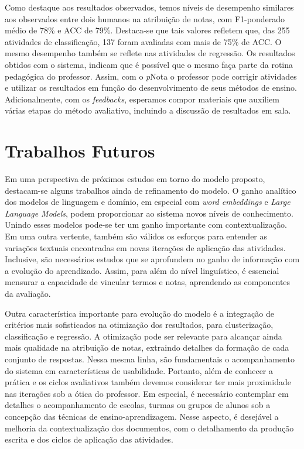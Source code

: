 Como destaque aos resultados observados, temos níveis de desempenho similares aos observados entre dois humanos na atribuição de notas, com F1-ponderado médio de 78\% e ACC de 79\%. Destaca-se que tais valores refletem que, das 255 atividades de classificação, 137 foram avaliadas com mais de 75\% de ACC. O mesmo desempenho também se reflete nas atividades de regressão. Os resultados obtidos com o sistema, indicam que é possível que o mesmo faça parte da rotina pedagógica do professor. Assim, com o \textit{p}Nota o professor pode corrigir atividades e utilizar os resultados em função do desenvolvimento de seus métodos de ensino. Adicionalmente, com os \textit{feedbacks}, esperamos compor materiais que auxiliem várias etapas do método avaliativo, incluindo a discussão de resultados em sala.

\section{Trabalhos Futuros}

Em uma perspectiva de próximos estudos em torno do modelo proposto, destacam-se alguns trabalhos ainda de refinamento do modelo. O ganho analítico dos modelos de linguagem e domínio, em especial com \textit{word embeddings} e \textit{Large Language Models}, podem proporcionar ao sistema novos níveis de conhecimento. Unindo esses modelos pode-se ter um ganho importante com contextualização. Em uma outra vertente, também são válidos os esforços para entender as variações textuais encontradas em novas iterações de aplicação das atividades. Inclusive, são necessários estudos que se aprofundem no ganho de informação com a evolução do aprendizado. Assim, para além do nível linguístico, é essencial mensurar a capacidade de vincular termos e notas, aprendendo as componentes da avaliação.

Outra característica importante para evolução do modelo é a integração de critérios mais sofisticados na otimização dos resultados, para clusterização, classificação e regressão. A otimização pode ser relevante para alcançar ainda mais qualidade na atribuição de notas, extraindo detalhes da formação de cada conjunto de respostas. Nessa mesma linha, são fundamentais o acompanhamento do sistema em características de usabilidade. Portanto, além de conhecer a prática e os ciclos avaliativos também devemos considerar ter mais proximidade nas iterações sob a ótica do professor. Em especial, é necessário contemplar em detalhes o acompanhamento de escolas, turmas ou grupos de alunos sob a concepção das técnicas de ensino-aprendizagem. Nesse aspecto, é desejável a melhoria da contextualização dos documentos, com o detalhamento da produção escrita e dos ciclos de aplicação das atividades.